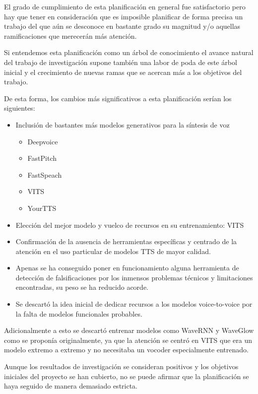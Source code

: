 El grado de cumplimiento de esta planificación en general fue satisfactorio pero hay que tener en consideración que es imposible planificar de forma precisa un trabajo del que aún se desconoce en bastante grado su magnitud y/o aquellas ramificaciones que merecerán más atención.

Si entendemos esta planificación como un árbol de conocimiento el avance natural del trabajo de investigación supone también una labor de poda de este árbol inicial y el crecimiento de nuevas ramas que se acercan más a los objetivos del trabajo.

De esta forma, los cambios más significativos a esta planificación serían los siguientes:

\begin{itemize}
    \item Inclusión de bastantes más modelos generativos para la síntesis de voz
    \begin{itemize}
        \item Deepvoice
        \item FastPitch
        \item FastSpeach
        \item VITS
        \item YourTTS
    \end{itemize}
    \item Elección del mejor modelo y vuelco de recursos en su entrenamiento: VITS
    \item Confirmación de la ausencia de herramientas específicas y centrado de la atención en el uso particular de modelos TTS de mayor calidad.
    \item Apenas se ha conseguido poner en funcionamiento alguna herramienta de detección de falsificaciones por los inmensos problemas técnicos y limitaciones encontradas, su peso se ha reducido acorde.
    \item Se descartó la idea inicial de dedicar recursos a los modelos voice-to-voice por la falta de modelos funcionales probables.
\end{itemize}

Adicionalmente a esto se descartó entrenar modelos como WaveRNN y WaveGlow como se proponía originalmente, ya que la atención se centró en VITS que era un modelo extremo a extremo y no necesitaba un vocoder especialmente entrenado. 

Aunque los resultados de investigación se consideran positivos y los objetivos iniciales del proyecto se han cubierto, no se puede afirmar que la planificación se haya seguido de manera demasiado estricta. 


